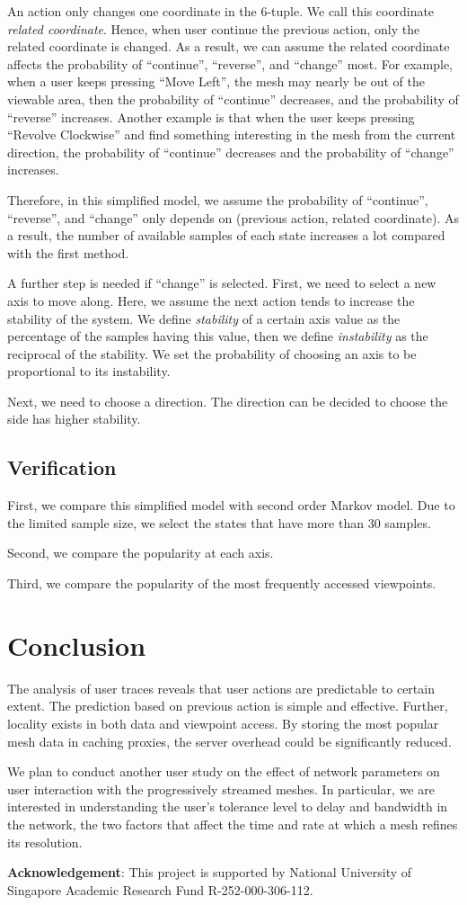 An action only changes one coordinate in the 6-tuple. We call this coordinate \textit{related coordinate}.
Hence, when user continue the previous action, only the related coordinate is changed. As a result, we 
can assume the related coordinate affects the probability of ``continue'', ``reverse'', and ``change'' most.
For example, when a user keeps pressing ``Move Left'', the mesh may nearly be out of the viewable area, 
then the probability of ``continue'' decreases, and the probability of ``reverse'' increases. 
Another example is that when the user keeps pressing ``Revolve Clockwise'' and find something interesting
in the mesh from the current direction,
the probability of ``continue'' decreases and the probability of ``change'' increases.

Therefore, in this simplified model, we assume the probability of ``continue'', ``reverse'', and ``change''
only depends on (previous action, related coordinate).
As a result, the number of available samples of each state increases a lot compared with the first method. 

A further step is needed if ``change'' is selected. First, we need to select a new axis to move along. Here, we 
assume the next action tends to increase the stability of the system. 
We define \textit{stability} of a certain axis value as the percentage of the samples having this value, 
then we define \textit{instability} as the reciprocal of the stability. 
We set the probability of choosing an axis to be proportional to its instability.  

Next, we need to choose a direction. The direction can be decided to choose the side has higher stability. 
\subsection{Verification}
First, we compare this simplified model with second order Markov model. Due to the limited sample size, we 
select the states that have more than 30 samples. 

Second, we compare the popularity at each axis. 

Third, we compare the popularity of the most frequently accessed viewpoints.
\section{Conclusion}
The analysis of user traces reveals that 
user actions are predictable to certain extent. The
prediction based on previous action is simple and effective. 
Further, locality exists in both data and viewpoint access. By
storing the most popular mesh data in caching proxies, 
the server overhead could be significantly reduced. 

We plan to conduct another user study on the effect
of network parameters on user interaction with the progressively
streamed meshes. In particular, we are interested in understanding
the user's tolerance level to delay and bandwidth in the network,
the two factors that affect the time and rate at which a mesh 
refines its resolution.

\textbf{Acknowledgement}:
This project is supported by National University of Singapore Academic
Research Fund R-252-000-306-112.
